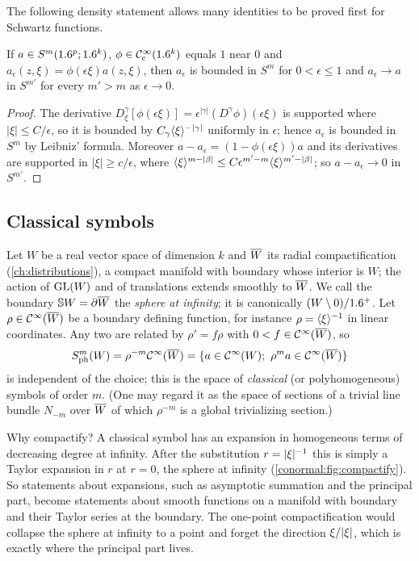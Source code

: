 The following density statement allows many identities to be proved first for
Schwartz functions.

\begin{lemma}\label{conormal:lem:density}
  If $a\in S^m(1.6^p;1.6^k)$, $\phi\in\mathcal{C}^\infty_{\mathrm{c}}(1.6^k)$ equals $1$ near $0$ and
  $a_\epsilon(z,\xi)=\phi(\epsilon\xi)a(z,\xi)$, then $a_\epsilon$ is bounded in
  $S^m$ for $0<\epsilon\le1$ and $a_\epsilon\to a$ in $S^{m'}$ for every $m'>m$
  as $\epsilon\to0$.
\end{lemma}
\begin{proof}
  The derivative $D_\xi^\gamma[\phi(\epsilon\xi)]=\epsilon^{|\gamma|}
  (D^\gamma\phi)(\epsilon\xi)$ is supported where $|\xi|\le C/\epsilon$, so it is
  bounded by $C_\gamma\langle \xi\rangle^{-|\gamma|}$ uniformly in $\epsilon$; hence
  $a_\epsilon$ is bounded in $S^m$ by Leibniz' formula.  Moreover
  $a-a_\epsilon=(1-\phi(\epsilon\xi))a$ and its derivatives are supported in
  $|\xi|\ge c/\epsilon$, where $\langle \xi\rangle^{m-|\beta|}\le
  C\epsilon^{m'-m}\langle \xi\rangle^{m'-|\beta|}$; so $a-a_\epsilon\to0$ in $S^{m'}$.
\end{proof}

\subsection{Classical symbols}
Let $W$ be a real vector space of dimension $k$ and $\overline{W}$ its radial
compactification (\cref{ch:distributions}), a compact manifold with boundary
whose interior is $W$; the action of $\operatorname{GL}(W)$ and of translations extends
smoothly to $\overline{W}$.  We call the boundary $\mathbb{S} W=\partial\overline{W}$ the
\emph{sphere at infinity}; it is canonically $(W\setminus 0)/1.6^+$.  Let
$\rho\in\mathcal{C}^\infty(\overline{W})$ be a boundary defining function, for instance
$\rho=\langle \xi\rangle^{-1}$ in linear coordinates.  Any two are related by
$\rho'=f\rho$ with $0<f\in\mathcal{C}^\infty(\overline{W})$, so
\begin{equation*}
  \Symph{m}(W)=\rho^{-m}\CI(\RC W)=\{a\in\CI(W);\ \rho^m a\in\CI(\RC W)\}
\end{equation*}
is independent of the choice; this is the space of \emph{classical} (or
polyhomogeneous) symbols of order $m$.  (One may regard it as the space of
sections of a trivial line bundle $N_{-m}$ over $\overline{W}$ of which $\rho^{-m}$ is
a global trivializing section.)

\begin{discussion}
  Why compactify? A classical symbol has an expansion in homogeneous terms of
  decreasing degree at infinity. After the substitution $r=\lvert \xi\rvert^{-1}$ this
  is simply a Taylor expansion in $r$ at $r=0$, the sphere at infinity
  (\cref{conormal:fig:compactify}). So statements about expansions, such as
  asymptotic summation and the principal part, become statements about smooth
  functions on a manifold with boundary and their Taylor series at the
  boundary. The one-point compactification would collapse the sphere at
  infinity to a point and forget the direction $\xi/\lvert \xi\rvert$, which is
  exactly where the principal part lives.
\end{discussion}

